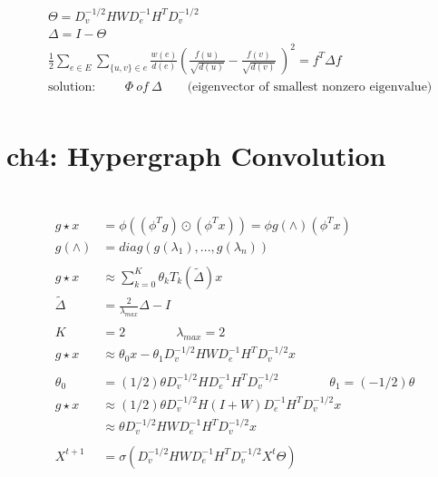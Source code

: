\documentclass{article}
\begin{document}
\begin{align*}
    & \Theta = D_{v}^{-1/2} H W D_{e}^{-1} H^{T} D_{v}^{-1/2}  \\[3pt]
    & \Delta = I - \Theta  \\[3pt]
    & \frac{1}{2} 
    \sum_{e \in E} \sum_{\{u, v\} \in e} 
    \frac{w(e)}{d(e)} 
    \left( \frac{f(u)}{\sqrt{d(u)}} - \frac{f(v)}{\sqrt{d(v)}}\ \right)^2 = 
    f^{T} \Delta f  \\[3pt]
    & \text{solution: } \qquad \Phi \ of \ \Delta \qquad 
    \text{(eigenvector of smallest nonzero eigenvalue)}  \\[3pt]
\end{align*}


\newpage
\section*{ch4: Hypergraph Convolution}


~ \\[3pt]
%
\begin{align*}
    ~ \\[3pt]
    g \star x &= \phi ( (\phi^{T} g) \odot (\phi^{T} x) ) 
              = \phi g(\wedge) (\phi^{T} x)  \\[3pt]
    g(\wedge) &= diag( g(\lambda_{1}), ..., g(\lambda_{n}) )  \\[3pt]
    ~ \\[3pt]
    g \star x & \approx \sum_{k=0}^{K} \theta_{k} T_{k} ( \tilde{\Delta} ) x  \\[3pt]
    \tilde{\Delta} & = \frac{2}{\lambda_{max}} \Delta - I  \\[3pt]
    ~ \\[3pt]
    K & = 2  \qquad \qquad \lambda_{max} = 2  \\[3pt]
    g \star x & \approx \theta_{0}x - \theta_{1} 
        D_{v}^{-1/2} H W D_{e}^{-1} H^{T} D_{v}^{-1/2} x  \\[3pt]
    ~ \\[3pt]
    \theta_{0} &= (1/2) \theta D_{v}^{-1/2} H D_{e}^{-1} H^{T} D_{v}^{-1/2} \qquad \qquad 
    \theta_{1} = (-1/2) \theta  \\[3pt]
    g \star x & \approx (1/2) \theta D_{v}^{-1/2} H (I+W) D_{e}^{-1} H^{T} D_{v}^{-1/2} x  \\[3pt]
              & \approx \theta D_{v}^{-1/2} H W D_{e}^{-1} H^{T} D_{v}^{-1/2} x  \\[3pt]
    ~ \\[3pt]
    X^{t+1} &= \sigma ( D_{v}^{-1/2} H W D_{e}^{-1} H^{T} D_{v}^{-1/2} X^{t} \varTheta )  \\[3pt]
\end{align*}
\end{document}
